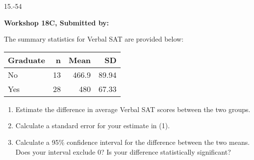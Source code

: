 \begin{exsol@exercise}{15.-54}
    \begin{center}
\begin{flushleft}\textbf{\large \hfill Workshop 18C, Submitted by: }\end{flushleft}

\end{center}

The summary statistics for Verbal SAT are provided below:

\begin{tabular}{@{} l rrr @{}} \hline
Graduate &	n &	Mean &	SD \\ \hline
No &	13 &	466.9 &	89.94 \\
Yes &	28 &	480 &	67.33 \\ \hline
\end{tabular}

\begin{enumerate}
  \item Estimate the difference in average Verbal SAT scores between the two groups.
  \item	Calculate a standard error for your estimate in (1).
  \item	Calculate a 95\% confidence interval for the difference between the two means. Does your interval exclude 0?  Is your difference statistically significant?
\end{enumerate}

\end{exsol@exercise}
